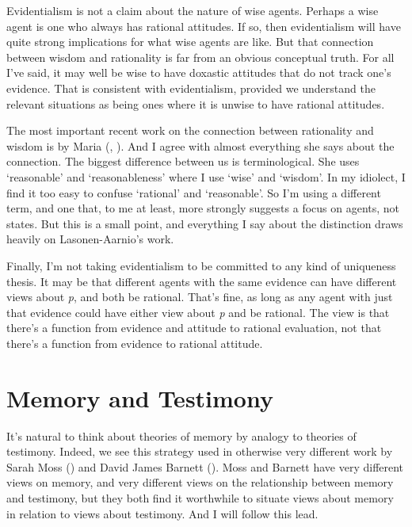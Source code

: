 \documentclass[
  11pt,
  letterpaper,
  DIV=11,
  numbers=noendperiod,
  twoside]{scrartcl}
\begin{document}
Evidentialism is not a claim about the nature of wise agents. Perhaps a
wise agent is one who always has rational attitudes. If so, then
evidentialism will have quite strong implications for what wise agents
are like. But that connection between wisdom and rationality is far from
an obvious conceptual truth. For all I've said, it may well be wise to
have doxastic attitudes that do not track one's evidence. That is
consistent with evidentialism, provided we understand the relevant
situations as being ones where it is unwise to have rational attitudes.

The most important recent work on the connection between rationality and
wisdom is by Maria (, ). And I agree with
almost everything she says about the connection. The biggest difference
between us is terminological. She uses `reasonable' and `reasonableness'
where I use `wise' and `wisdom'. In my idiolect, I find it too easy to
confuse `rational' and `reasonable'. So I'm using a different term, and
one that, to me at least, more strongly suggests a focus on agents, not
states. But this is a small point, and everything I say about the
distinction draws heavily on Lasonen-Aarnio's work.

Finally, I'm not taking evidentialism to be committed to any kind of
uniqueness thesis. It may be that different agents with the same
evidence can have different views about \emph{p}, and both be rational.
That's fine, as long as any agent with just that evidence could have
either view about \emph{p} and be rational. The view is that there's a
function from evidence and attitude to rational evaluation, not that
there's a function from evidence to rational attitude.

\section{Memory and Testimony}\label{memoryandtestimony}

It's natural to think about theories of memory by analogy to theories of
testimony. Indeed, we see this strategy used in otherwise very different
work by Sarah Moss () and David James
Barnett (). Moss and Barnett have very
different views on memory, and very different views on the relationship
between memory and testimony, but they both find it worthwhile to
situate views about memory in relation to views about testimony. And I
will follow this lead.
\end{document}
